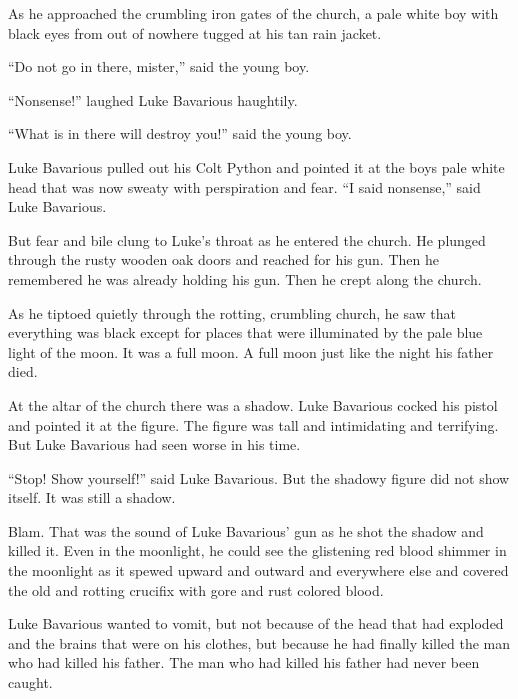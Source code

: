 As he approached the crumbling iron gates of the church, a pale
white boy with black eyes from out of nowhere tugged at his tan
rain jacket.



``Do not go in there, mister,'' said the young boy.



``Nonsense!'' laughed Luke Bavarious haughtily.



``What is in there will destroy you!'' said the young
boy.



Luke Bavarious pulled out his Colt Python and pointed it at the
boys pale white head that was now sweaty with perspiration and
fear. ``I said nonsense,'' said Luke Bavarious.



But fear and bile clung to Luke's throat as he entered the
church. He plunged through the rusty wooden oak doors and reached
for his gun. Then he remembered he was already holding his gun.
Then he crept along the church.



As he tiptoed quietly through the rotting, crumbling church, he saw
that everything was black except for places that were illuminated
by the pale blue light of the moon. It was a full moon. A full moon
just like the night his father died.



At the altar of the church there was a shadow. Luke Bavarious
cocked his pistol and pointed it at the figure. The figure was tall
and intimidating and terrifying. But Luke Bavarious had seen worse
in his time.



``Stop! Show yourself!'' said Luke Bavarious. But the
shadowy figure did not show itself. It was still a shadow.



Blam. That was the sound of Luke Bavarious' gun as he shot
the shadow and killed it. Even in the moonlight, he could see the
glistening red blood shimmer in the moonlight as it spewed upward
and outward and everywhere else and covered the old and rotting
crucifix with gore and rust colored blood.



Luke Bavarious wanted to vomit, but not because of the head that
had exploded and the brains that were on his clothes, but because
he had finally killed the man who had killed his father. The man
who had killed his father had never been caught.



